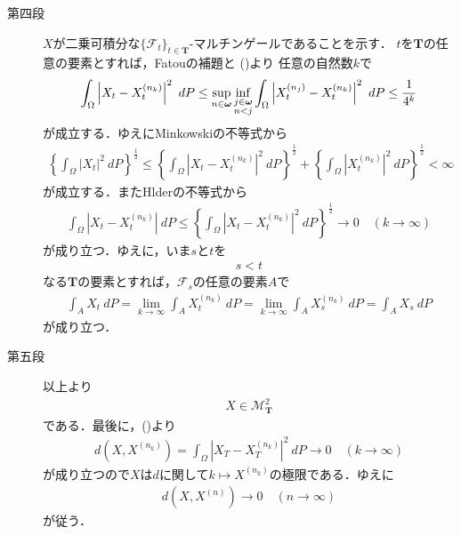 \begin{sketch}
\begin{description}
			\item[第四段]
				$X$が二乗可積分な$\{\mathscr{F}_t\}_{t \in \mathbf{T}}$-マルチンゲールであることを示す．
				$t$を$\mathbf{T}$の任意の要素とすれば，Fatouの補題と
				()より
				任意の自然数$k$で
				\begin{align}
					\int_\Omega \left|X_t-X_t^{(n_k)}\right|^2\ dP
					\leq \sup{n \in \Natural}{\inf{\substack{j \in \Natural \\ n < j}}{
					\int_\Omega \left|X_t^{(n_j)}-X_t^{(n_k)}\right|^2\ dP}}
					\leq \frac{1}{4^k}
					\label{fom:thm_pseudo_metric_on_square_integrable_martingales_3}
 				\end{align}
 				が成立する．ゆえにMinkowskiの不等式から
 				\begin{align}
 					\left\{\int_\Omega |X_t|^2\ dP\right\}^{\frac{1}{2}}
 					\leq \left\{\int_\Omega \left|X_t - X^{(n_k)}_t\right|^2\ dP\right\}^{\frac{1}{2}}
 					+ \left\{\int_\Omega \left|X^{(n_k)}_t\right|^2\ dP\right\}^{\frac{1}{2}}
 					< \infty
 				\end{align}
 				が成立する．またHlderの不等式から
 				\begin{align}
 					\int_\Omega \left|X_t-X_t^{(n_k)}\right|\ dP
 					\leq \left\{\int_\Omega \left|X_t - X^{(n_k)}_t\right|^2\ dP\right\}^{\frac{1}{2}}
 					\longrightarrow 0\quad (k \longrightarrow \infty)
 				\end{align}
 				が成り立つ．ゆえに，いま$s$と$t$を
 				\begin{align}
 					s < t
 				\end{align}
 				なる$\mathbf{T}$の要素とすれば，$\mathscr{F}_s$の任意の要素$A$で
 				\begin{align}
 					\int_A X_t\ dP = \lim_{k \to \infty} \int_A X^{(n_k)}_t\ dP
 					= \lim_{k \to \infty} \int_A X^{(n_k)}_s\ dP
 					= \int_A X_s\ dP
 				\end{align}
 				が成り立つ．
 			
 			\item[第五段]
 				以上より
 				\begin{align}
 					X \in \mathscr{M}^2_{\mathbf{T}}
 				\end{align}
 				である．最後に，()より
 				\begin{align}
 					d\left(X,X^{(n_k)}\right) = \int_\Omega \left|X_T-X_T^{(n_k)}\right|^2\ dP
 					\longrightarrow 0\quad (k \longrightarrow \infty)
 				\end{align}
 				が成り立つので$X$は$d$に関して$k \longmapsto X^{(n_k)}$の極限である．ゆえに
 				\begin{align}
 					d\left(X,X^{(n)}\right) \longrightarrow 0\quad (n \longrightarrow \infty)
 				\end{align}
 				が従う．
 				\QED
		\end{description}
	\end{sketch}
	
